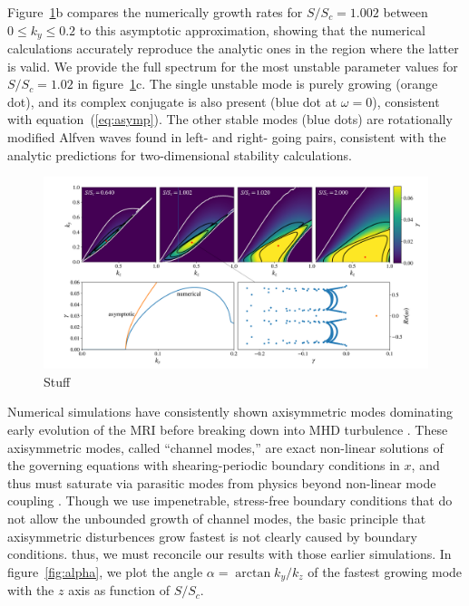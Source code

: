 \documentclass[aps,prl,reprint,superscriptaddress]{revtex4-1}
\newcommand{\SSC}{S/S_{c}}
\begin{document}
Figure~\ref{fig:growth_rate}b compares the numerically growth rates for $\SSC=1.002$ between $0 \le k_y \le 0.2$ to this asymptotic approximation, showing that the numerical calculations accurately reproduce the analytic ones in the region where the latter is valid.
We provide the full spectrum for the most unstable parameter values for $\SSC = 1.02$ in figure~\ref{fig:growth_rate}c.
The single unstable mode is purely growing (orange dot), and its complex conjugate is also present (blue dot at $\omega = 0$), consistent with equation~(\ref{eq:asymp}).
The other stable modes (blue dots) are rotationally modified Alfven waves found in left- and right- going pairs, consistent with the analytic predictions for two-dimensional stability calculations.
%
\onecolumngrid

\begin{figure}[h!]
  \includegraphics[width=\textwidth]{fig_1.pdf}
  \caption{Stuff}
  \label{fig:growth_rate}
\end{figure}
\twocolumngrid
%
Numerical simulations have consistently shown axisymmetric modes dominating early evolution of the MRI before breaking down into MHD turbulence \citep{1995ApJ...440..742H,2018ApJ...853..174H,2019ApJS..241...26D}. 
These axisymmetric modes, called ``channel modes,'' are exact non-linear solutions of the governing equations with shearing-periodic boundary conditions in $x$, and thus must saturate via parasitic modes from physics beyond non-linear mode coupling \citep{1994ApJ...432..213G}.
Though we use impenetrable, stress-free boundary conditions that do not allow the unbounded growth of channel modes, the basic principle that axisymmetric disturbences grow fastest is not clearly caused by boundary conditions.
thus, we must reconcile our results with those earlier simulations.
In figure~\ref{fig:alpha}, we plot the angle $\alpha = \arctan k_y/k_z$ of the fastest growing mode with the $z$ axis as function of $\SSC$.
\end{document}
